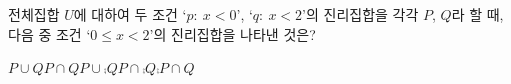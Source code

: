 전체집합 $U$에 대하여 두 조건 `$p:\ x<0$', `$q:\ x<2$'의 진리집합을 각각 $P$, $Q$라 할 때, 다음 중 조건 `$0\le x<2$'의 진리집합을 나타낸 것은?
\begin{choices32}{$P\cup Q$}{$P\cap Q$}{$P\cup\comp{Q}$}{$P\cap\comp{Q}$}{$\comp{P}\cap Q$}\end{choices32}
